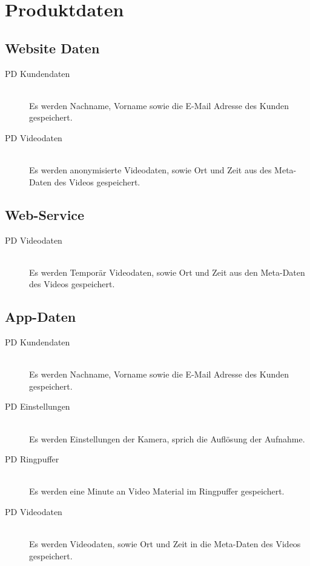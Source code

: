 \chapter{Produktdaten}

\section{Website Daten}
\begin{description}
\item[PD Kundendaten]\hfill \\
Es werden Nachname, Vorname sowie die E-Mail Adresse des Kunden gespeichert.
\item[PD Videodaten]\hfill \\
Es werden anonymisierte Videodaten, sowie Ort und Zeit aus des Meta-Daten des Videos gespeichert.
\end{description}

\section{Web-Service}
\begin{description}
\item[PD Videodaten]\hfill \\
Es werden Temporär Videodaten, sowie Ort und Zeit aus den Meta-Daten des Videos gespeichert.
\end{description}

\section{App-Daten}
\begin{description}
\item[PD Kundendaten]\hfill \\
Es werden Nachname, Vorname sowie die E-Mail Adresse des Kunden gespeichert.
\item[PD Einstellungen]\hfill \\
Es werden Einstellungen der Kamera, sprich die Auflösung der Aufnahme.
\item[PD Ringpuffer]\hfill \\
Es werden eine Minute an Video Material im Ringpuffer gespeichert.
\item[PD Videodaten]\hfill \\
Es werden Videodaten, sowie Ort und Zeit in die Meta-Daten des Videos gespeichert.
\end{description}
